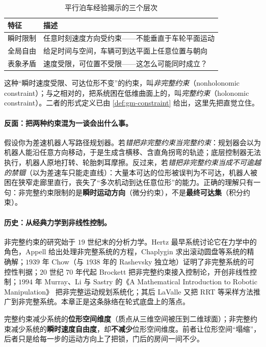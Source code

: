 \begin{table}[H]\centering\small
\caption{平行泊车经验揭示的三个层次}
\begin{tabular}{ll}
\toprule
特征 & 描述 \\
\midrule
瞬时限制 & 任意时刻速度方向受约束——不能垂直于车轮平面运动 \\
全局自由 & 给足时间与空间，车辆可到达平面上任意位置与朝向 \\
表象矛盾 & 速度受限，可位置不受限——这怎么可能同时成立？ \\
\bottomrule
\end{tabular}
\end{table}

\noindent 这种“瞬时速度受限、可达位形不变”的约束，叫\emph{非完整约束}（nonholonomic constraint）；与之相对的，把系统困在低维曲面上的，叫\emph{完整约束}（holonomic constraint）。二者的形式定义已由 \cref{def:gm-constraint} 给出，这里先把直觉立住。

\paragraph{反面：把两种约束混为一谈会出什么事。}
假设你为差速机器人写路径规划器。若\emph{错把非完整约束当完整约束}：规划器会以为机器人能沿任意方向移动，于是生成含横移、含直角拐弯的轨迹；底层控制器无法执行，机器人原地打转、轮胎刺耳摩擦。反过来，若\emph{错把非完整约束当成不可逾越的禁锢}（以为差速车只能走直线）：大量本可达的位形被误判为不可达，机器人被困在狭窄走廊里直行，丧失了“多次机动到达任意位形”的能力。正确的理解只有一句：非完整约束限制的是\textbf{瞬时运动方向}（微分约束），不是\textbf{最终可达集}（积分约束）。

\paragraph{历史：从经典力学到非线性控制。}
非完整约束的研究始于 $19$ 世纪末的分析力学。Hertz 最早系统讨论它在力学中的角色，Appell 给出处理非完整系统的方程，Chaplygin 求出滚动圆盘等系统的精确解；$1939$ 年 Chow（与 $1938$ 年的 Rashevsky 独立地）证明了非完整系统的可控性判据；$20$ 世纪 $70$ 年代起 Brockett 把非完整约束接入控制论，开创非线性控制；$1994$ 年 Murray、Li 与 Sastry 的《A Mathematical Introduction to Robotic Manipulation》\cite{murray1994mathematical} 把非完整运动规划系统化；其后 LaValle\cite{lavalle2006planning} 又把 RRT 等采样方法推广到非完整系统。本章正是这条脉络在轮式底盘上的落点。

\begin{insight}[完整 vs 非完整的一句话区分]\label{ins:mw-holo}
完整约束减少系统的\textbf{位形空间维度}（质点从三维空间被压到二维球面）；非完整约束减少系统的\textbf{瞬时速度自由度}，却\textbf{不减少}位形空间维度。前者让位形空间“塌缩”，后者只是给每一步的运动方向上了把锁，门后的房间一间不少。
\end{insight}

